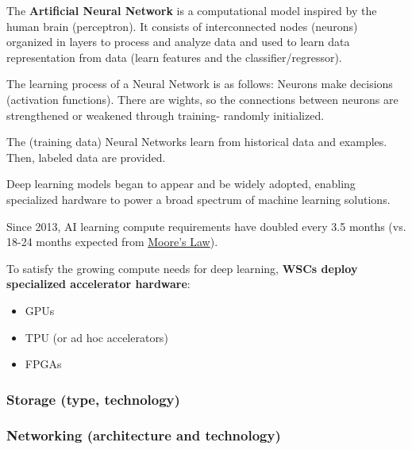 \documentclass[a4paper]{article}
\newcommand{\highspace}{\vspace{1.2em}\noindent}
\begin{document}
    \begin{deepeningbox}
        The \textbf{Artificial Neural Network} is a computational model inspired by the human brain (perceptron). It consists of interconnected nodes (neurons) organized in layers to process and analyze data and used to learn data representation from data (learn features and the classifier/regressor).

        \highspace
        The learning process of a Neural Network is as follows: Neurons make decisions (activation functions). There are wights, so the connections between neurons are strengthened or weakened through training- randomly initialized.

        The (training data) Neural Networks learn from historical data and examples. Then, labeled data are provided.
    \end{deepeningbox}

    \begin{deepeningbox}
        Deep learning models began to appear and be widely adopted, enabling specialized hardware to power a broad spectrum of machine learning solutions.
        
        Since 2013, AI learning compute requirements have doubled every 3.5 months (vs. 18-24 months expected from \href{https://en.wikipedia.org/wiki/Moore's_law}{Moore's Law}).

        To satisfy the growing compute needs for deep learning, \textbf{WSCs deploy specialized accelerator hardware}:
        \begin{itemize}
            \item GPUs
            \item TPU (or ad hoc accelerators)
            \item FPGAs
        \end{itemize}
    \end{deepeningbox}

    \newpage

    \subsubsection{Storage (type, technology)}\label{subsubsection: Storage (type, technology)}

    \subsubsection{Networking (architecture and technology)}\label{subsubsection: Networking (architecture and technology)}



    \newpage

    \pagestyle{fancy}
    \fancyhead{} %
    \fancyhead[R]{\nouppercase{\leftmark}}

    {}
    

    \newpage

    \printindex
\end{document}
